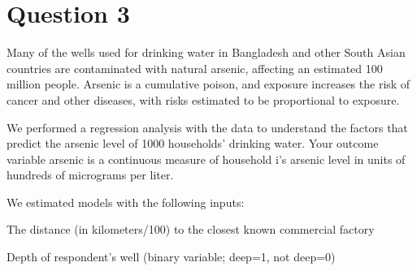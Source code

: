 \documentclass[12pt,letterpaper]{article}
\begin{document}
\newpage

\section*{Question 3}
\vspace{.25cm}
\noindent Many of the wells used for drinking water in Bangladesh and other South Asian countries are contaminated with natural arsenic, affecting an estimated 100 million people. Arsenic is a cumulative poison, and exposure increases the risk of cancer and other diseases, with risks estimated to be proportional to exposure.

We performed a regression analysis with the data to understand the factors that predict the arsenic level of 1000 households’ drinking water. Your outcome variable arsenic is a continuous measure of household i’s arsenic level in units of hundreds of micrograms per liter.

We estimated models with the following inputs:

The distance (in kilometers/100) to the closest known commercial factory

Depth of respondent’s well (binary variable; deep=1, not deep=0)
\end{document}
